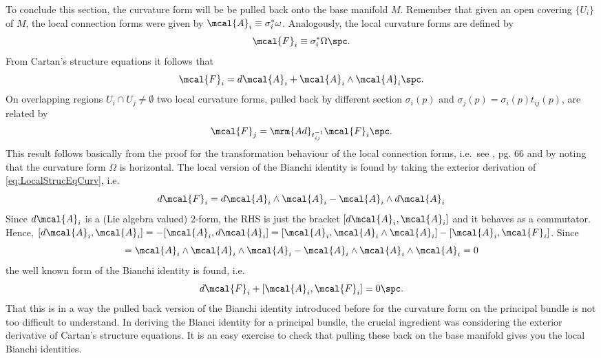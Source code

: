 \documentclass[10pt,reqno]{amsart}
\numberwithin{equation}{section}
\begin{document}
\blankline
To conclude this section, the curvature form will be be pulled 
back onto the base manifold $M$. Remember that given an open 
covering $\{U_i\}$ of $M$, the local connection forms were given 
by $\mcal{A}_i \equiv \sigma_i^\ast \omega$. Analogously, the 
local curvature forms are defined by
%
\begin{equation}
	\mcal{F}_i \equiv \sigma_i^\ast \Omega \spc.
\end{equation}
%
From Cartan's structure equations it follows that
%
\begin{equation}\label{eq:LocalStrucEqCurv}
	\mcal{F}_i = d\mcal{A}_i + \mcal{A}_i \wedge \mcal{A}_i \spc.
\end{equation}
%
On overlapping regions $U_i \cap U_j \neq \emptyset$ two local 
curvature forms, pulled back by different section $\sigma_i(p)$ 
and $\sigma_j(p) = \sigma_i(p)t_{ij}(p)$, are related by
%
\begin{equation}\label{eq:GaugeTrafo_F}
	\mcal{F}_j = \mrm{Ad}_{t_{ij}^{-1}} \mcal{F}_i \spc.
\end{equation}
%
This result follows basically from the proof for the 
transformation behaviour of the local connection forms, i.e.\ see 
\cite{kob1996found}, pg. 66 and by noting that the curvature form 
$\Omega$ is horizontal. The local version of the Bianchi identity 
is found by taking the exterior derivation of 
\eqref{eq:LocalStrucEqCurv}, i.e.\
%
\begin{displaymath}
	d\mcal{F}_i = d\mcal{A}_i \wedge \mcal{A}_i - \mcal{A}_i \wedge 
	d\mcal{A}_i
\end{displaymath}
%
Since $d\mcal{A}_i$ is a (Lie algebra valued) $2$-form, the RHS 
is just the bracket $[d\mcal{A}_i,\mcal{A}_i]$ and it behaves as 
a commutator. Hence, $[d\mcal{A}_i,\mcal{A}_i] = -[\mcal{A}_i,
d\mcal{A}_i] = [\mcal{A}_i, \mcal{A}_i \wedge \mcal{A}_i] - 
[\mcal{A}_i, \mcal{F}_i]$. Since
%
\begin{displaymath}
	[\mcal{A}_i, \mcal{A}_i \wedge \mcal{A}_i]
	= \mcal{A}_i \wedge \mcal{A}_i \wedge \mcal{A}_i -
	\mcal{A}_i \wedge \mcal{A}_i \wedge \mcal{A}_i = 0
\end{displaymath}
%
the well known form of the Bianchi identity is found, i.e.\
%
\begin{equation}
	d\mcal{F}_i + [\mcal{A}_i, \mcal{F}_i] = 0 \spc.
\end{equation}
%
That this is in a way the pulled back version of the Bianchi 
identity introduced before for the curvature form on the 
principal bundle is not too difficult to understand. In deriving 
the Bianci identity for a principal bundle, the crucial 
ingredient was considering the exterior derivative of Cartan's 
structure equations.  It is an easy exercise to check that 
pulling these back on the base manifold gives you the local 
Bianchi identities.
\end{document}
